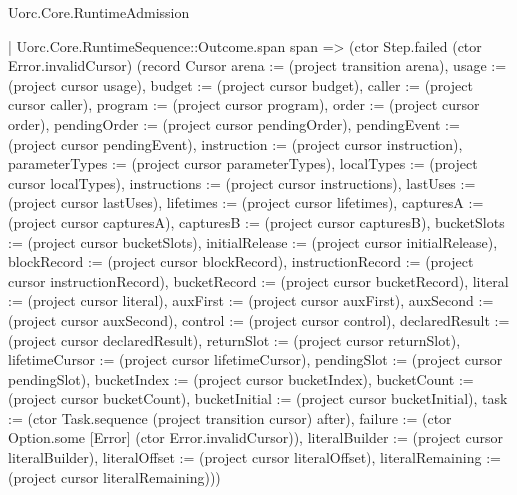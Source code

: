 \begin{lexlean}{Uorc.Core.RuntimeAdmission}
\begin{semanticmodule}
{        | Uorc.Core.RuntimeSequence::Outcome.span span => (ctor Step.failed (ctor Error.invalidCursor) (record Cursor {arena := (project transition arena), usage := (project cursor usage), budget := (project cursor budget), caller := (project cursor caller), program := (project cursor program), order := (project cursor order), pendingOrder := (project cursor pendingOrder), pendingEvent := (project cursor pendingEvent), instruction := (project cursor instruction), parameterTypes := (project cursor parameterTypes), localTypes := (project cursor localTypes), instructions := (project cursor instructions), lastUses := (project cursor lastUses), lifetimes := (project cursor lifetimes), capturesA := (project cursor capturesA), capturesB := (project cursor capturesB), bucketSlots := (project cursor bucketSlots), initialRelease := (project cursor initialRelease), blockRecord := (project cursor blockRecord), instructionRecord := (project cursor instructionRecord), bucketRecord := (project cursor bucketRecord), literal := (project cursor literal), auxFirst := (project cursor auxFirst), auxSecond := (project cursor auxSecond), control := (project cursor control), declaredResult := (project cursor declaredResult), returnSlot := (project cursor returnSlot), lifetimeCursor := (project cursor lifetimeCursor), pendingSlot := (project cursor pendingSlot), bucketIndex := (project cursor bucketIndex), bucketCount := (project cursor bucketCount), bucketInitial := (project cursor bucketInitial), task := (ctor Task.sequence (project transition cursor) after), failure := (ctor Option.some [Error] (ctor Error.invalidCursor)), literalBuilder := (project cursor literalBuilder), literalOffset := (project cursor literalOffset), literalRemaining := (project cursor literalRemaining)}))
}
\end{semanticmodule}
\end{lexlean}

